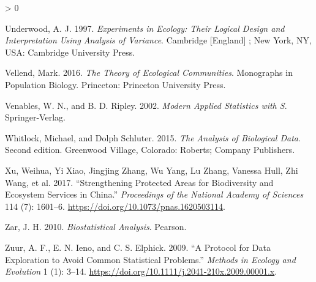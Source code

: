 \documentclass[
]{article}
\newlength{\cslhangindent}
\newenvironment{CSLReferences}[2] %
 {%
  \setlength{\parindent}{0pt}
  \ifodd #1 \everypar{\setlength{\hangindent}{\cslhangindent}}\ignorespaces\fi
  \ifnum #2 > 0
  \setlength{\parskip}{#2\baselineskip}
  \fi
 }%
 {}
\begin{document}
\begin{CSLReferences}{1}{0}
\leavevmode\hypertarget{ref-underwood_experiments_1997}{}%
Underwood, A. J. 1997. \emph{Experiments in Ecology: Their Logical Design and Interpretation Using Analysis of Variance}. Cambridge {[}England{]} ; New York, NY, USA: Cambridge University Press.

\leavevmode\hypertarget{ref-vellend_theory_2016}{}%
Vellend, Mark. 2016. \emph{The Theory of Ecological Communities}. Monographs in Population Biology. Princeton: Princeton University Press.

\leavevmode\hypertarget{ref-venables_modern_2002}{}%
Venables, W. N., and B. D. Ripley. 2002. \emph{Modern Applied Statistics with {S}}. Springer-Verlag.

\leavevmode\hypertarget{ref-whitlock_analysis_2015}{}%
Whitlock, Michael, and Dolph Schluter. 2015. \emph{The Analysis of Biological Data}. Second edition. Greenwood Village, Colorado: Roberts; Company Publishers.

\leavevmode\hypertarget{ref-xu_strengthening_2017}{}%
Xu, Weihua, Yi Xiao, Jingjing Zhang, Wu Yang, Lu Zhang, Vanessa Hull, Zhi Wang, et al. 2017. {``Strengthening Protected Areas for Biodiversity and Ecosystem Services in {China}.''} \emph{Proceedings of the National Academy of Sciences} 114 (7): 1601--6. \url{https://doi.org/10.1073/pnas.1620503114}.

\leavevmode\hypertarget{ref-zar_biostatistical_2010}{}%
Zar, J. H. 2010. \emph{Biostatistical Analysis}. Pearson.

\leavevmode\hypertarget{ref-zuur_protocol_2009}{}%
Zuur, A. F., E. N. Ieno, and C. S. Elphick. 2009. {``A Protocol for Data Exploration to Avoid Common Statistical Problems.''} \emph{Methods in Ecology and Evolution} 1 (1): 3--14. \url{https://doi.org/10.1111/j.2041-210x.2009.00001.x}.

\end{CSLReferences}
\end{document}
